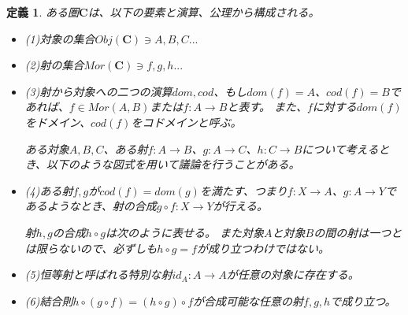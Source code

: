 \documentclass[dvipdfmx]{jsarticle}
\newcommand{\cat}[1]{\boldsymbol{#1}}
\newcommand{\arrow}{\rightarrow}
\newcommand{\obj}[1]{Obj(\cat{#1})}
\newcommand{\mor}[3]{#1:#2\arrow #3}
\newtheorem{define}{定義}[section]
\begin{document}
	\begin{define}
		ある圏$\cat{C}$は、以下の要素と演算、公理から構成される。
		\begin{itemize}
			\item (1)対象の集合$\obj{C}\ni A,B,C...$
			\item (2)射の集合$Mor(\cat{C})\ni f,g,h...$
			\item (3)射から対象への二つの演算$dom,cod$、もし$dom(f)=A$、$cod(f)=B$であれば、$f\in Mor(A,B)$または$\mor{f}{A}{B}$と表す。
			また、$f$に対する$dom(f)$をドメイン、$cod(f)$をコドメインと呼ぶ。

			ある対象$A,B,C$、ある射$\mor{f}{A}{B}$、$\mor{g}{A}{C}$、$\mor{h}{C}{B}$について考えるとき、以下のような図式を用いて議論を行うことがある。
			\begin{center}
			\end{center}

			\item (4)ある射$f,g$が$cod(f)=dom(g)$を満たす、つまり$\mor{f}{X}{A}$、$\mor{g}{A}{Y}$であるようなとき、射の合成$\mor{g\circ f}{X}{Y}$が行える。

			射$h,g$の合成$h\circ g$は次のように表せる。
			また対象$A$と対象$B$の間の射は一つとは限らないので、必ずしも$h\circ g=f$が成り立つわけではない。
			\begin{center}
			\end{center}
			\item (5)恒等射と呼ばれる特別な射$\mor{id_A}{A}{A}$が任意の対象に存在する。
			\item (6)結合則$h\circ (g\circ f)=(h\circ g)\circ f$が合成可能な任意の射$f,g,h$で成り立つ。


\end{itemize}
\end{define}
\end{document}
